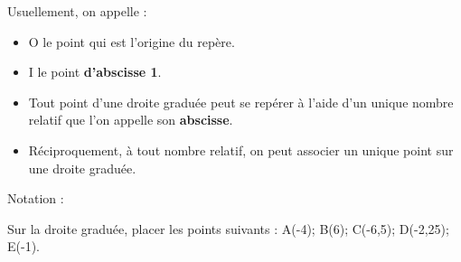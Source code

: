 \documentclass[a4paper]{book}
\begin{document}
    \begin{remarque}
        Usuellement, on appelle : 
        \begin{itemize}
            \item O le point qui est l'origine du repère.
            \item I le point \textbf{d'abscisse 1}.
        \end{itemize}
    \end{remarque}

    \begin{center}
    \end{center}
    

    \begin{propriete}
        \begin{itemize}
            \item Tout point d'une droite graduée peut se repérer à l'aide d'un unique nombre relatif que l'on appelle son \textbf{abscisse}.

            \item Réciproquement, à tout nombre relatif, on peut associer un unique point sur une droite graduée.
        \end{itemize}

        Notation : 
    \end{propriete}

    \begin{exemple}
        Sur la droite graduée, placer les points suivants : A(-4); B(6); C(-6,5); D(-2,25); E(-1).
    
        \begin{center}
        \end{center}     
    \end{exemple}
\end{document}
